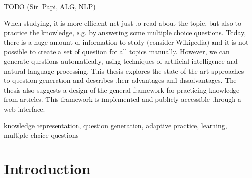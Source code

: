 \documentclass[a4paper, 12pt, twoside]{fithesis2}		%
\renewcommand{\_}{\leavevmode \kern0.0em\vbox{\hrule width0.4em}}
\newcounter{choice}
\begin{document}
\FrontMatter
\ThesisTitlePage

\begin{ThesisDeclaration}
\DeclarationText
\AdvisorName
\end{ThesisDeclaration}

\begin{ThesisThanks}

  TODO (Sir, Papi, ALG, NLP)


\end{ThesisThanks}

\begin{ThesisAbstract}
When studying, it is more efficient not just to read about the topic, but also to practice the knowledge, e.g. by answering some multiple choice questions. Today, there is a huge amount of information to study (consider Wikipedia) and it is not possible to create a set of question for all topics manually. However, we can generate questions automatically, using techniques of artificial intelligence and natural language processing. This thesis explores the state-of-the-art approaches to question generation and describes their advantages and disadvantages. The thesis also suggests a design of the general framework for practicing knowledge from articles. This framework is implemented and publicly accessible through a web interface.
\end{ThesisAbstract}

\begin{ThesisKeyWords}
knowledge representation, question generation, adaptive practice, learning,
multiple choice questions
\end{ThesisKeyWords}

\MainMatter
\tableofcontents

\chapter{Introduction}
\label{chap:intro}
\end{document}
